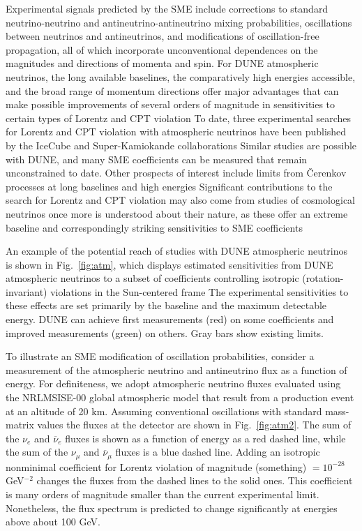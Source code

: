 Experimental signals predicted by the SME include
corrections to standard neutrino-neutrino 
and antineutrino-antineutrino mixing probabilities,
oscillations between neutrinos and antineutrinos,
and modifications of oscillation-free propagation,
all of which incorporate unconventional dependences
on the magnitudes and directions of momenta and spin.
For DUNE atmospheric neutrinos,
the long available baselines,
the comparatively high energies accessible,
and the broad range of momentum directions
offer major advantages that can make possible 
improvements of several orders of magnitude
in sensitivities to certain types of Lorentz and CPT violation
To date,
three experimental searches for Lorentz and CPT violation
with atmospheric neutrinos have been published 
by the IceCube and Super-Kamiokande collaborations
Similar studies are possible with DUNE,
and many SME coefficients can be measured that remain unconstrained to date.
Other prospects of interest include limits from \v Cerenkov processes
at long baselines and high energies
Significant contributions to the search 
for Lorentz and CPT violation may also 
come from studies of cosmological neutrinos
once more is understood about their nature,
as these offer an extreme baseline
and correspondingly striking sensitivities
to SME coefficients

An example of the potential reach of studies with DUNE atmospheric neutrinos
is shown in Fig.\ \ref{fig:atm},
which displays estimated sensitivities
from DUNE atmospheric neutrinos to a subset of coefficients 
controlling isotropic (rotation-invariant) violations 
in the Sun-centered frame
The experimental sensitivities to these effects
are set primarily by the baseline and the maximum detectable energy.
DUNE can achieve first measurements (red) on some coefficients
and improved measurements (green) on others.
Gray bars show existing limits.

To illustrate an SME modification of oscillation probabilities,
consider a measurement of the atmospheric neutrino and antineutrino flux
as a function of energy.
For definiteness,
we adopt atmospheric neutrino fluxes 
evaluated using the NRLMSISE-00 global atmospheric model
that result from a production event at an altitude of 20 km.
Assuming conventional oscillations with standard mass-matrix values 
the fluxes at the detector are shown in Fig.\ \ref{fig:atm2}.
The sum of the $\nu_e$ and $\overline\nu_e$ fluxes
is shown as a function of energy as a red dashed line, 
while the sum of the $\nu_\mu$ and $\overline\nu_\mu$ fluxes 
is a blue dashed line. 
Adding an isotropic nonminimal coefficient for Lorentz violation
of magnitude %
(something) $= 10^{-28}$ GeV$^{-2}$
changes the fluxes from the dashed lines to the solid ones.
This coefficient is many orders of magnitude smaller
than the current experimental limit.
Nonetheless,
the flux spectrum is predicted to change significantly 
at energies above about 100 GeV. 

